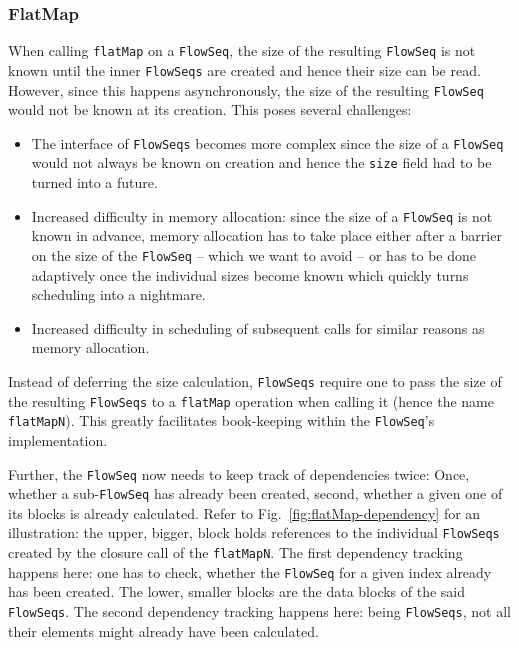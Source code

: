 \documentclass[runningheads,a4paper,fleqn]{llncs}
\begin{document}
\subsubsection{FlatMap}
\label{sssec:flatMapN}

When calling \texttt{flatMap} on a \texttt{FlowSeq}, the size of the
resulting \texttt{FlowSeq} is not known until the inner \texttt{FlowSeqs} are
created and hence their size can be read. However, since this happens 
asynchronously, the size of the resulting \texttt{FlowSeq} would not be known
at its creation. This poses several challenges:

\begin{itemize}
\item The interface of \texttt{FlowSeqs} becomes more complex since the size
  of a \texttt{FlowSeq} would not always be known on creation and hence the
  \texttt{size} field had to be turned into a future.
\item Increased difficulty in memory allocation: since the size of a
  \texttt{FlowSeq} is not known in advance, memory allocation has to take
  place either after a barrier on the size of the \texttt{FlowSeq} -- which
  we want to avoid -- or has to be done adaptively once the individual
  sizes become known which quickly turns scheduling into a
  nightmare. 
\item Increased difficulty in scheduling of subsequent calls for
  similar reasons as memory allocation.
\end{itemize}

Instead of deferring the size calculation, \texttt{FlowSeqs} require
one to pass
the size of the resulting \texttt{FlowSeqs} to a \texttt{flatMap}
operation 
when calling it (hence the name \texttt{flatMapN}). This greatly 
facilitates book-keeping within the \texttt{FlowSeq}'s
implementation.

Further, the \texttt{FlowSeq} now needs to keep track of dependencies twice:
Once, whether a sub-\texttt{FlowSeq} has already been created, second,
whether a given one of its blocks is already calculated. Refer to
Fig.~\ref{fig:flatMap-dependency} for an illustration: the upper,
bigger, block holds references to the individual \texttt{FlowSeqs} created by
the closure call of the \texttt{flatMapN}. The first dependency
tracking happens here: one has to check, whether the \texttt{FlowSeq} for a
given index already has been created. The lower, smaller blocks are
the data blocks of the said \texttt{FlowSeqs}. The second dependency tracking
happens here: being \texttt{FlowSeqs}, not all their elements might already
have been calculated.
\end{document}

